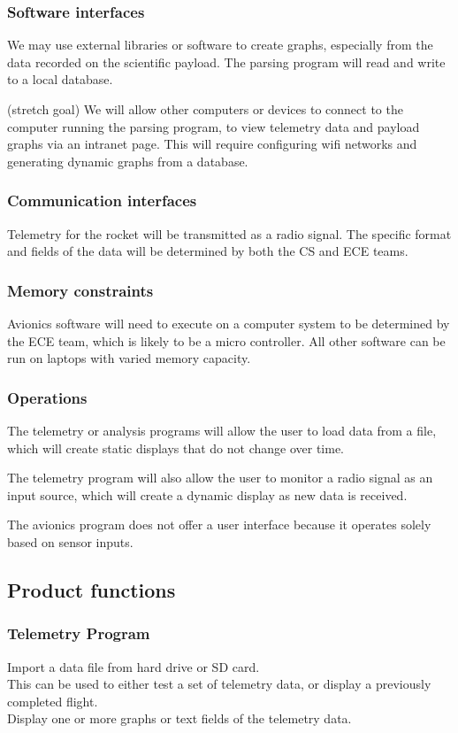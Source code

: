 \documentclass[onecolumn, draftclsnofoot, 10pt, compsoc]{IEEEtran}
\begin{document}
\subsubsection{Software interfaces}
We may use external libraries or software to create graphs, especially from the data recorded on the scientific payload.  The parsing program will read and write to a local database.

(stretch goal) We will allow other computers or devices to connect to the computer running the parsing program, to view telemetry data and payload graphs via an intranet page.  This will require configuring wifi networks and generating dynamic graphs from a database.

\subsubsection{Communication interfaces}
Telemetry for the rocket will be transmitted as a radio signal.  The specific format and fields of the data will be determined by both the CS and ECE teams.

\subsubsection{Memory constraints}
Avionics software will need to execute on a computer system to be determined by the ECE team, which is likely to be a micro controller. All other software can be run on laptops with varied memory capacity.

\subsubsection{Operations}
The telemetry or analysis programs will allow the user to load data from a file, which will create static displays that do not change over time.

The telemetry program will also allow the user to monitor a radio signal as an input source, which will create a dynamic display as new data is received.

The avionics program does not offer a user interface because it operates solely based on sensor inputs.

\subsection{Product functions}
\subsubsection{Telemetry Program}
Import a data file from hard drive or SD card.\\
This can be used to either test a set of telemetry data, or display a previously completed flight.\\
Display one or more graphs or text fields of the telemetry data.
\end{document}
